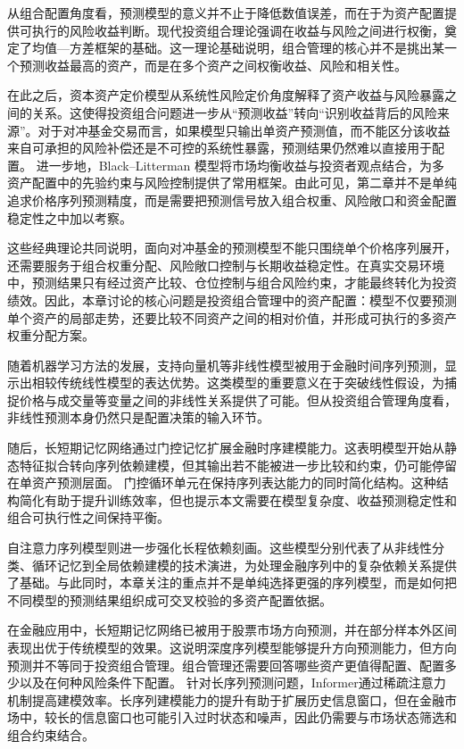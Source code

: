 从组合配置角度看，预测模型的意义并不止于降低数值误差，而在于为资产配置提供可执行的风险收益判断。现代投资组合理论强调在收益与风险之间进行权衡，奠定了均值—方差框架的基础\cite{markowitz1952portfolio}。这一理论基础说明，组合管理的核心并不是挑出某一个预测收益最高的资产，而是在多个资产之间权衡收益、风险和相关性。

在此之后，资本资产定价模型从系统性风险定价角度解释了资产收益与风险暴露之间的关系\cite{sharpe1964capital}。这使得投资组合问题进一步从“预测收益”转向“识别收益背后的风险来源”。对于对冲基金交易而言，如果模型只输出单资产预测值，而不能区分该收益来自可承担的风险补偿还是不可控的系统性暴露，预测结果仍然难以直接用于配置。
进一步地，Black--Litterman 模型将市场均衡收益与投资者观点结合，为多资产配置中的先验约束与风险控制提供了常用框架\cite{black1992global}。由此可见，第二章并不是单纯追求价格序列预测精度，而是需要把预测信号放入组合权重、风险敞口和资金配置稳定性之中加以考察。

这些经典理论共同说明，面向对冲基金的预测模型不能只围绕单个价格序列展开，还需要服务于组合权重分配、风险敞口控制与长期收益稳定性。在真实交易环境中，预测结果只有经过资产比较、仓位控制与组合风险约束，才能最终转化为投资绩效。因此，本章讨论的核心问题是投资组合管理中的资产配置：模型不仅要预测单个资产的局部走势，还要比较不同资产之间的相对价值，并形成可执行的多资产权重分配方案。

随着机器学习方法的发展，支持向量机等非线性模型被用于金融时间序列预测，显示出相较传统线性模型的表达优势\cite{tay2001application}。这类模型的重要意义在于突破线性假设，为捕捉价格与成交量等变量之间的非线性关系提供了可能。但从投资组合管理角度看，非线性预测本身仍然只是配置决策的输入环节。

随后，长短期记忆网络通过门控记忆扩展金融时序建模能力\cite{hochreiter1997long}。这表明模型开始从静态特征拟合转向序列依赖建模，但其输出若不能被进一步比较和约束，仍可能停留在单资产预测层面。
门控循环单元在保持序列表达能力的同时简化结构\cite{cho2014learning}。这种结构简化有助于提升训练效率，但也提示本文需要在模型复杂度、收益预测稳定性和组合可执行性之间保持平衡。

自注意力序列模型则进一步强化长程依赖刻画\cite{vaswani2017attention}。这些模型分别代表了从非线性分类、循环记忆到全局依赖建模的技术演进，为处理金融序列中的复杂依赖关系提供了基础。与此同时，本章关注的重点并不是单纯选择更强的序列模型，而是如何把不同模型的预测结果组织成可交叉校验的多资产配置依据。

在金融应用中，长短期记忆网络已被用于股票市场方向预测，并在部分样本外区间表现出优于传统模型的效果\cite{fischer2018deep}。这说明深度序列模型能够提升方向预测能力，但方向预测并不等同于投资组合管理。组合管理还需要回答哪些资产更值得配置、配置多少以及在何种风险条件下配置。
针对长序列预测问题，Informer通过稀疏注意力机制提高建模效率\cite{zhou2021informer}。长序列建模能力的提升有助于扩展历史信息窗口，但在金融市场中，较长的信息窗口也可能引入过时状态和噪声，因此仍需要与市场状态筛选和组合约束结合。

